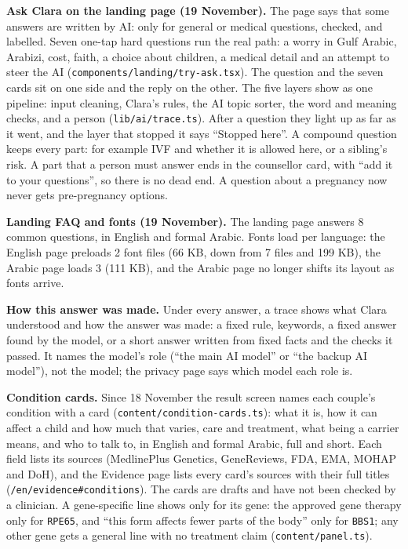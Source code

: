 \documentclass[10.5pt,a4paper]{article}
\newcommand{\code}[1]{\texttt{\small #1}}
\newcommand{\file}[1]{\leavevmode\textcolor{muted}{\texttt{\small #1}}}
\begin{document}
\textbf{Ask Clara on the landing page (19 November).} The page says that some answers are written by AI: only
for general or medical questions, checked, and labelled. Seven one-tap hard questions run the real path: a worry in Gulf
Arabic, Arabizi, cost, faith, a choice about children, a medical detail and an attempt to steer the AI
(\file{components/landing/try-ask.tsx}). The question and the seven cards sit on one side and the reply on the other.
The five layers show as one pipeline: input cleaning, Clara's rules, the AI topic sorter, the word and meaning checks,
and a person (\file{lib/ai/trace.ts}). After a question they light up as far as it went, and the layer that stopped it
says ``Stopped here''. A
compound question keeps every part: for example IVF and whether it is allowed here, or a sibling's risk. A part that a
person must answer ends in the counsellor card, with ``add it to your questions'', so there is no dead end. A question
about a pregnancy now never gets pre-pregnancy options.

\textbf{Landing FAQ and fonts (19 November).} The landing page answers 8 common questions, in English and formal Arabic.
Fonts load per language: the English page preloads 2 font files (66 KB, down from 7 files and 199 KB), the Arabic page
loads 3 (111 KB), and the Arabic page no longer shifts its layout as fonts arrive.

\textbf{How this answer was made.} Under every answer, a trace shows what Clara understood and how the answer was made:
a fixed rule, keywords, a fixed answer found by the model, or a short answer written from fixed facts and the
checks it passed. It names the model's role (``the main AI model'' or ``the backup AI model''), not the model; the
privacy page says which model each role is.

\textbf{Condition cards.} Since 18 November the result screen names each couple's condition with a card
(\file{content/condition-cards.ts}): what it is, how it can affect a child and how much that varies, care and
treatment, what being a carrier means, and who to talk to, in English and formal Arabic, full and short. Each field
lists its sources (MedlinePlus Genetics, GeneReviews, FDA, EMA, MOHAP and DoH), and the Evidence page lists every
card's sources with their full titles (\code{/en/evidence\#conditions}). The cards are drafts and have not been checked
by a clinician. A gene-specific line shows only for its gene: the approved gene therapy only for \code{RPE65}, and
``this form affects fewer parts of the body'' only for \code{BBS1}; any other gene gets a general line with no treatment
claim (\file{content/panel.ts}).
\end{document}
